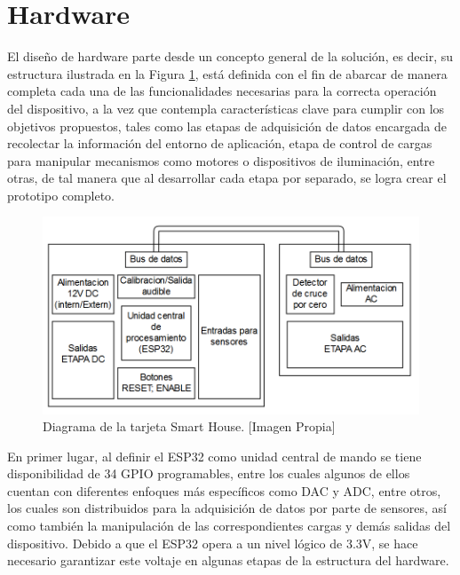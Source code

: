 \section{Hardware}\label{sec:hw}

El diseño de hardware parte desde un concepto general de la solución, es decir, su estructura ilustrada en la Figura \ref{fig:tar}, está definida con el fin de abarcar de manera completa cada una de las funcionalidades necesarias para la correcta operación del dispositivo, a la vez que contempla características clave para cumplir con los objetivos propuestos, tales como las etapas de adquisición de datos encargada de recolectar la información del entorno de aplicación, etapa de control de cargas para manipular mecanismos como motores o dispositivos de iluminación, entre otras, de tal manera que al desarrollar cada etapa por separado, se logra crear el prototipo completo.\\

\begin{figure}[H]
	\centering
	\caption[Diagrama de la tarjeta Smart House.]{Diagrama de la tarjeta Smart House.  [Imagen Propia]}
	\label{fig:tar}
	\includegraphics[width=0.99\linewidth]{Imagenes/Tarjeta}
\end{figure}

En primer lugar, al definir el ESP32 como unidad central de mando se tiene disponibilidad de 34 GPIO programables, entre los cuales algunos de ellos cuentan con diferentes enfoques más específicos como DAC y ADC, entre otros, los cuales son distribuidos para la adquisición de datos por parte de sensores, así como también la manipulación de las correspondientes cargas y demás salidas del dispositivo. Debido a que el ESP32 opera a un nivel lógico de 3.3V, se hace necesario garantizar este voltaje en algunas etapas de la estructura del hardware.\\

